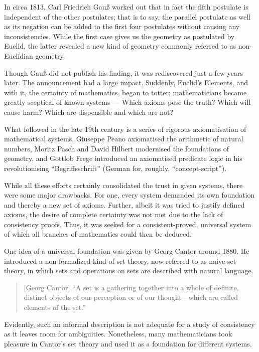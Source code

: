 \documentclass[hidelinks]{article}
\begin{document}
In circa 1813, Carl Friedrich Gauß worked out that in fact the fifth postulate is independent of the other postulates; that is to say, the parallel postulate as well as its negation can be added to the first four postulates without causing any inconsistencies. While the first case gives us the geometry as postulated by Euclid, the latter revealed a new kind of geometry commonly referred to as non-Euclidian geometry.

Though Gauß did not publish his finding, it was rediscovered just a few years later. The announcement had a large impact. Suddenly, Euclid's Elements, and with it, the certainty of mathematics, began to totter; mathematicians became greatly sceptical of known systems --- Which axioms pose the truth? Which will cause harm? Which are dispensible and which are not?

What followed in the late 19th century is a series of rigorous axiomatisation of mathematical systems. Giuseppe Peano axiomatised the arithmetic of natural numbers, Moritz Pasch and David Hilbert modernised the foundations of geometry, and Gottlob Frege introduced an axiomatised predicate logic in his revolutionising ``Begriffsschrift'' (German for, roughly, ``concept-script'').

While all these efforts certainly consolidated the trust in given systems, there were some major drawbacks. For one, every system demanded its own foundation and thereby a new set of axioms. Further, albeit it was tried to justify defined axioms, the desire of complete certainty was not met due to the lack of consistency proofs. Thus, it was seeked for a consistent-proved, universal system of which all branches of mathematics could then be deduced.

One idea of a universal foundation was given by Georg Cantor around 1880. He introduced a non-formalized kind of set theory, now referred to as naive set theory, in which sets and operations on sets are described with natural language. 

\begin{quote}[Georg Cantor]
``A set is a gathering together into a whole of definite, distinct objects of our perception or of our thought—which are called elements of the set.''\cite{cantor_set}
\end{quote}

Evidently, such an informal description is not adequate for a study of consistency as it leaves room for ambiguities. Nonetheless, many mathematicians took pleasure in Cantor's set theory and used it as a foundation for different systems.
\end{document}
